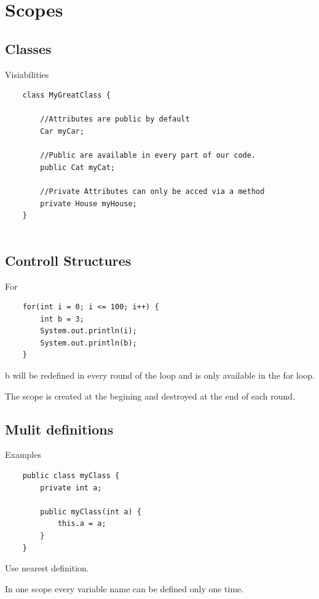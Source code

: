 \section{Scopes}
\subsection{Classes}

\begin{frame}[fragile]{Visiabilities}
	\begin{lstlisting}
	class MyGreatClass {
	
		//Attributes are public by default
		Car myCar; 
	
		//Public are available in every part of our code.
		public Cat myCat;
		
		//Private Attributes can only be acced via a method
		private House myHouse;
	}
		
	\end{lstlisting}
\end{frame}

\subsection{Controll Structures}
\begin{frame}[fragile]{For}
	\begin{lstlisting}
	for(int i = 0; i <= 100; i++) {
		int b = 3;
		System.out.println(i);
		System.out.println(b);
	}
	\end{lstlisting}
	
	b will be redefined in every round of the loop and is only available in the for loop.
	
	The scope is created at the begining and destroyed at the end of each round.
\end{frame}
  
\subsection{Mulit definitions}
\begin{frame}[fragile]{Examples}
	\begin{lstlisting}
	public class myClass {
		private int a;
	
		public myClass(int a) {
			this.a = a;
		}
	}
	\end{lstlisting}

	Use nearest definition.

	In one scope every variable name can be defined only one time.
\end{frame}
    
